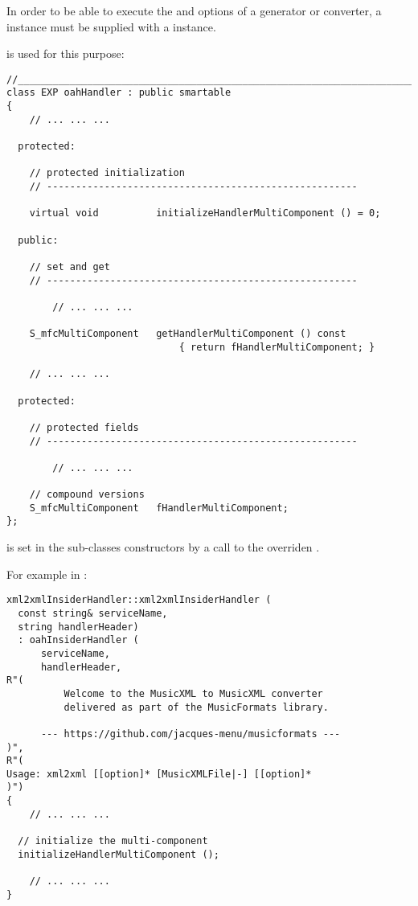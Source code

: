In order to be able to execute the  and  options of a generator or converter, a  instance must be supplied with a  instance.

 is used for this purpose:
\begin{lstlisting}[language=CPlusPlus]
//_______________________________________________________________________________
class EXP oahHandler : public smartable
{
	// ... ... ...

  protected:

    // protected initialization
    // ------------------------------------------------------

    virtual void          initializeHandlerMultiComponent () = 0;

  public:

    // set and get
    // ------------------------------------------------------

		// ... ... ...

    S_mfcMultiComponent   getHandlerMultiComponent () const
                              { return fHandlerMultiComponent; }

	// ... ... ...

  protected:

    // protected fields
    // ------------------------------------------------------

		// ... ... ...

    // compound versions
    S_mfcMultiComponent   fHandlerMultiComponent;
};
\end{lstlisting}

 is set in the  sub-classes constructors by a call to the overriden .

For example in :
\begin{lstlisting}[language=CPlusPlus]
xml2xmlInsiderHandler::xml2xmlInsiderHandler (
  const string& serviceName,
  string handlerHeader)
  : oahInsiderHandler (
      serviceName,
      handlerHeader,
R"(
          Welcome to the MusicXML to MusicXML converter
          delivered as part of the MusicFormats library.

      --- https://github.com/jacques-menu/musicformats ---
)",
R"(
Usage: xml2xml [[option]* [MusicXMLFile|-] [[option]*
)")
{
	// ... ... ...

  // initialize the multi-component
  initializeHandlerMultiComponent ();

	// ... ... ...
}
\end{lstlisting}

